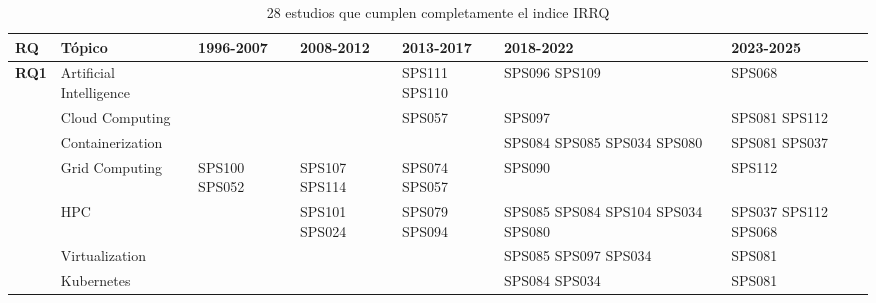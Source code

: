 \begin{table*}[htbp]
	\centering
	\caption{28 estudios que cumplen completamente el indice IRRQ}
	\label{table:highest_IRRQ}
	\renewcommand{\arraystretch}{1.2}
	\setlength{\tabcolsep}{6pt}
	\begin{tabularx}{\textwidth}{p{0.8cm}p{2.5cm}>{\raggedright\arraybackslash}X>{\raggedright\arraybackslash}X>{\raggedright\arraybackslash}X>{\raggedright\arraybackslash}X>{\raggedright\arraybackslash}X}
		\toprule
		\textbf{RQ}                          & \textbf{Tópico}         & \textbf{1996-2007} & \textbf{2008-2012}   & \textbf{2013-2017}          & \textbf{2018-2022}                               & \textbf{2023-2025}          \\
		\midrule
		\multirow{12}{*}[0em]{\textbf{RQ1}}  & Artificial Intelligence &                    &                      & SPS111 SPS110               & SPS096 SPS109                                    & SPS068                      \\
		\addlinespace[0.3em]
		                                     & Cloud Computing         &                    &                      & SPS057                      & SPS097                                           & SPS081 SPS112               \\
		\addlinespace[0.3em]
		                                     & Containerization        &                    &                      &                             & SPS084 SPS085 SPS034 SPS080                      & SPS081 SPS037               \\
		\addlinespace[0.3em]
		                                     & Grid Computing          & SPS100 SPS052      & SPS107 SPS114        & SPS074 SPS057               & SPS090                                           & SPS112                      \\
		\addlinespace[0.3em]
		                                     & HPC                     &                    & SPS101 SPS024        & SPS079 SPS094               & SPS085 SPS084 SPS104 SPS034 SPS080               & SPS037 SPS112 SPS068        \\
		\addlinespace[0.3em]
		                                     & Virtualization          &                    &                      &                             & SPS085 SPS097 SPS034                             & SPS081                      \\
		\addlinespace[0.3em]
		                                     & Kubernetes              &                    &                      &                             & SPS084 SPS034                                    & SPS081                      \\

\end{tabularx}
\end{table*}
